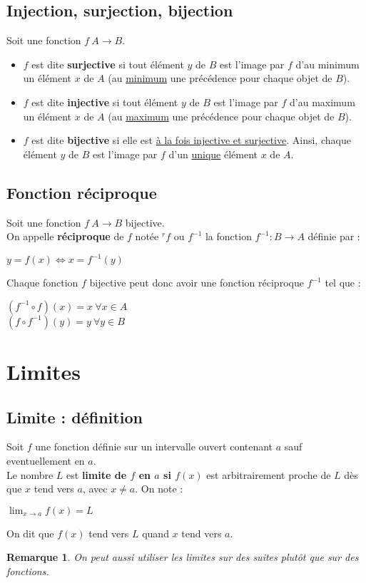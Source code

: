 \documentclass[12pt, a4paper]{book}
\newtheorem*{remarque}{Remarque}
\begin{document}
\subsection{Injection, surjection, bijection}
Soit une fonction $f \ A \rightarrow B$.
\begin{itemize}
    \item $f$ est dite \textbf{surjective} si tout élément $y$ de $B$ est l'image par $f$ d'au minimum un élément $x$ de $A$ (au \underline{minimum} une précédence pour chaque objet de $B$).

    \item $f$ est dite \textbf{injective} si tout élément $y$ de $B$ est l'image par $f$ d'au maximum un élément $x$ de $A$ (au \underline{maximum} une précédence pour chaque objet de $B$).

    \item $f$ est dite \textbf{bijective} si elle est \underline{à la fois injective et surjective}. Ainsi, chaque élément $y$ de $B$ est l'image par $f$ d'un \underline{unique} élément $x$ de $A$.

\end{itemize}
\subsection{Fonction réciproque}
Soit une fonction $f \ A \rightarrow B$ bijective.\\
On appelle \textbf{réciproque} de $f$ notée $^rf$ ou $f^{-1}$ la fonction $f^{-1} : B \rightarrow A$ définie par :
\begin{center}
    $y=f(x) \Leftrightarrow x = f^{-1}(y)$
\end{center}
Chaque fonction $f$ bijective peut donc avoir une fonction réciproque $f^{-1}$ tel que :
\begin{center}
    $(f^{-1} \circ f)(x) = x \ \forall x \in A$\\
    $(f \circ f^{-1})(y) = y \ \forall y \in B$
\end{center}
\newpage
\section{Limites}
\subsection{Limite : définition}
Soit $f$ une fonction définie sur un intervalle ouvert contenant $a$ sauf eventuellement en $a$.\\
Le nombre $L$ est \textbf{limite de $f$ en $a$ si $f(x)$} est arbitrairement proche de $L$ dès que $x$ tend vers $a$, avec $x \not = a$. 
On note : \begin{center}
    $\lim_{x \to a} f(x) = L$
\end{center}
On dit que $f(x)$ tend vers $L$ quand $x$ tend vers $a$.\\
\begin{remarque}
    On peut aussi utiliser les limites sur des suites plutôt que sur des fonctions.
\end{remarque}
\end{document}
